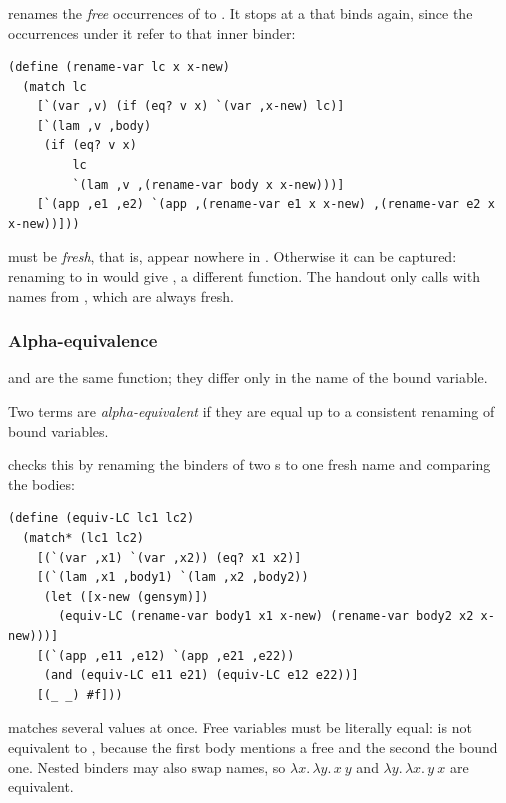 \subsubsection{} renames the \emph{free} occurrences of  to . It stops at a  that binds  again, since the occurrences under it refer to that inner binder:
\begin{lstlisting}
(define (rename-var lc x x-new)
  (match lc
    [`(var ,v) (if (eq? v x) `(var ,x-new) lc)]
    [`(lam ,v ,body)
     (if (eq? v x)
         lc
         `(lam ,v ,(rename-var body x x-new)))]
    [`(app ,e1 ,e2) `(app ,(rename-var e1 x x-new) ,(rename-var e2 x x-new))]))
\end{lstlisting}
 must be \emph{fresh}, that is, appear nowhere in . Otherwise it can be captured: renaming  to  in  would give , a different function. The handout only calls  with names from , which are always fresh.

\subsubsection{Alpha-equivalence}  and  are the same function; they differ only in the name of the bound variable.

\begin{definition}
Two terms are \emph{alpha-equivalent} if they are equal up to a consistent renaming of bound variables.
\end{definition}

 checks this by renaming the binders of two s to one fresh name and comparing the bodies:
\begin{lstlisting}
(define (equiv-LC lc1 lc2)
  (match* (lc1 lc2)
    [(`(var ,x1) `(var ,x2)) (eq? x1 x2)]
    [(`(lam ,x1 ,body1) `(lam ,x2 ,body2))
     (let ([x-new (gensym)])
       (equiv-LC (rename-var body1 x1 x-new) (rename-var body2 x2 x-new)))]
    [(`(app ,e11 ,e12) `(app ,e21 ,e22))
     (and (equiv-LC e11 e21) (equiv-LC e12 e22))]
    [(_ _) #f]))
\end{lstlisting}
 matches several values at once. Free variables must be literally equal:  is not equivalent to , because the first body mentions a free  and the second the bound one. Nested binders may also swap names, so $\lambda x.\, \lambda y.\, x\ y$ and $\lambda y.\, \lambda x.\, y\ x$ are equivalent.

